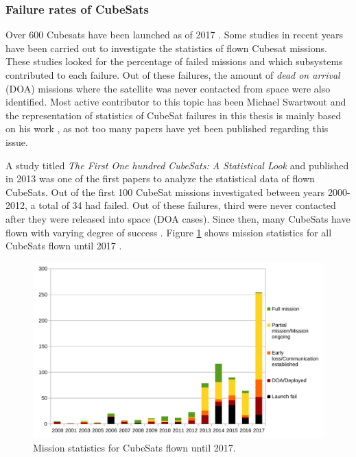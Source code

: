 \documentclass[english,12pt,a4paper,pdftex,elec,utf8]{aaltothesis}
\begin{document}
\subsubsection{Failure rates of CubeSats}
Over 600 Cubesats have been launched as of 2017 \cite{Swart2017kalvo}. Some studies in recent years have been carried out to investigate the statistics of flown Cubesat missions. These studies looked for the percentage of failed missions and which subsystems contributed to each failure. Out of these failures, the amount of \textit{dead on arrival} (DOA) missions where the satellite was never contacted from space were also identified. Most active contributor to this topic has been Michael Swartwout and the representation of statistics of CubeSat failures in this thesis is mainly based on his work \cite{Swart1, Swart2016, Swart2015}, as not too many papers have yet been published regarding this issue.\par 
A study titled \textit{The First One hundred CubeSats: A Statistical Look} and published in 2013 was one of the first papers to analyze the statistical data of flown CubeSats. Out of the first 100 CubeSat missions investigated between years 2000-2012, a total of 34 had failed. Out of these failures, third were never contacted after they were released into space (DOA cases). Since then, many CubeSats have flown with varying degree of success \cite{Swart2016}. Figure \ref{100first} shows mission statistics for all CubeSats flown until 2017 \cite{csdatabase}. \par
\begin{figure}[h!]
\centering
\includegraphics[scale=0.6]{cfdnew}
\caption{Mission statistics for CubeSats flown until 2017. \cite{csdatabase}}
\label{100first}
\end{figure} 
\end{document}
